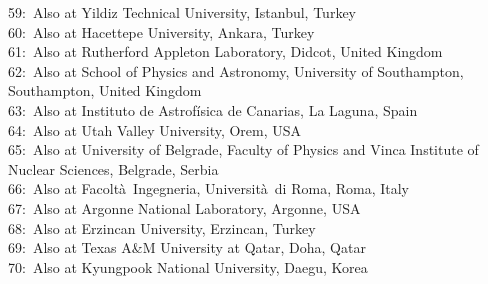 $$59:~Also at Yildiz Technical University, Istanbul, Turkey\\
60:~Also at Hacettepe University, Ankara, Turkey\\
61:~Also at Rutherford Appleton Laboratory, Didcot, United Kingdom\\
62:~Also at School of Physics and Astronomy, University of Southampton, Southampton, United Kingdom\\
63:~Also at Instituto de Astrof\'{i}sica de Canarias, La Laguna, Spain\\
64:~Also at Utah Valley University, Orem, USA\\
65:~Also at University of Belgrade, Faculty of Physics and Vinca Institute of Nuclear Sciences, Belgrade, Serbia\\
66:~Also at Facolt\`{a}~Ingegneria, Universit\`{a}~di Roma, Roma, Italy\\
67:~Also at Argonne National Laboratory, Argonne, USA\\
68:~Also at Erzincan University, Erzincan, Turkey\\
69:~Also at Texas A\&M University at Qatar, Doha, Qatar\\
70:~Also at Kyungpook National University, Daegu, Korea\\


